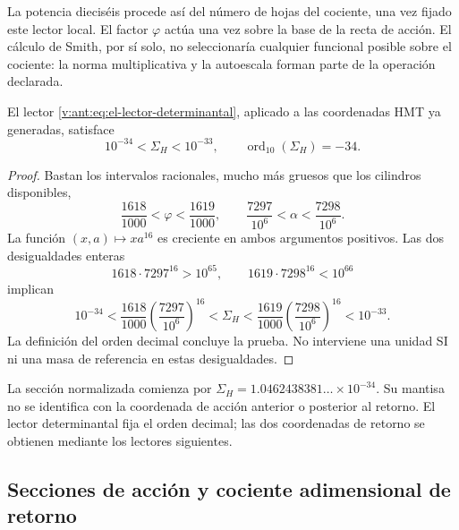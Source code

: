 La potencia dieciséis procede así del número de hojas del cociente, una
vez fijado este lector local. El factor \(\varphi\) actúa una vez sobre
la base de la recta de acción. El cálculo de Smith, por sí solo, no
seleccionaría cualquier funcional posible sobre el cociente: la norma
multiplicativa y la autoescala forman parte de la operación declarada.

\begin{theorem}
El lector \eqref{v:ant:eq:el-lector-determinantal}, aplicado a las coordenadas
HMT ya generadas, satisface
\begin{equation}
 10^{-34}<\Sigma_H<10^{-33},\qquad
 \operatorname{ord}_{10}(\Sigma_H)=-34.
 \label{v:ant:eq:el-decada}
\end{equation}
\end{theorem}
\begin{proof}
Bastan los intervalos racionales, mucho más gruesos que los cilindros
disponibles,
\[
 \frac{1618}{1000}<\varphi<\frac{1619}{1000},\qquad
 \frac{7297}{10^6}<\alpha<\frac{7298}{10^6}.
\]
La función \((x,a)\mapsto xa^{16}\) es creciente en ambos argumentos
positivos. Las dos desigualdades enteras
\[
 1618\cdot7297^{16}>10^{65},\qquad
 1619\cdot7298^{16}<10^{66}
\]
implican
\[
 10^{-34}
 <\frac{1618}{1000}\left(\frac{7297}{10^6}\right)^{16}
 <\Sigma_H
 <\frac{1619}{1000}\left(\frac{7298}{10^6}\right)^{16}
 <10^{-33}.
\]
La definición del orden decimal concluye la prueba. No interviene una
unidad SI ni una masa de referencia en estas desigualdades.
\end{proof}

La sección normalizada comienza por
\(\Sigma_H=1.0462438381\ldots\times10^{-34}\). Su mantisa no se
identifica con la coordenada de acción anterior o posterior al retorno.
El lector determinantal fija el orden decimal; las dos coordenadas de
retorno se obtienen mediante los lectores siguientes.


\subsection{Secciones de acción y cociente adimensional de retorno}

